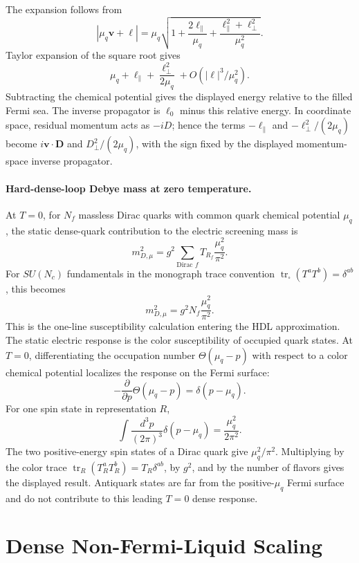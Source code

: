 The expansion follows from
\[
  |\mu_q\mathbf v+\boldsymbol\ell|
  =
  \mu_q
  \sqrt{
    1+\frac{2\ell_\parallel}{\mu_q}
    +\frac{\ell_\parallel^2+\boldsymbol\ell_\perp^2}{\mu_q^2}
  }.
\]
Taylor expansion of the square root gives
\[
  \mu_q+\ell_\parallel+\frac{\boldsymbol\ell_\perp^2}{2\mu_q}
  +O(|\boldsymbol\ell|^3/\mu_q^2).
\]
Subtracting the chemical potential gives the displayed energy relative to
the filled Fermi sea.  The inverse propagator is \(\ell_0\) minus this
relative energy.  In coordinate space, residual momentum acts as
\(-iD\); hence the terms \(-\ell_\parallel\) and
\(-\boldsymbol\ell_\perp^2/(2\mu_q)\) become
\(i\mathbf v\cdot\mathbf D\) and \(D_\perp^2/(2\mu_q)\), with the sign
fixed by the displayed momentum-space inverse propagator.

\paragraph{Hard-dense-loop Debye mass at zero temperature.}
At \(T=0\), for \(N_f\) massless Dirac quarks with common quark chemical
potential \(\mu_q\), the static dense-quark contribution to the electric
screening mass is
\[
  m_{D,\mu}^2
  =
  g^2\sum_{\text{Dirac }f}T_{R_f}\frac{\mu_q^2}{\pi^2}.
\]
For \(SU(N_c)\) fundamentals in the monograph trace convention
\(\operatorname{tr}_{\square}(T^aT^b)=\delta^{ab}\), this becomes
\[
  m_{D,\mu}^2=g^2N_f\frac{\mu_q^2}{\pi^2}.
\]
This is the one-line susceptibility calculation entering the HDL
approximation.  The static electric response is the color susceptibility of
occupied quark states.  At \(T=0\), differentiating the occupation number
\(\Theta(\mu_q-p)\) with respect to a color chemical potential localizes the
response on the Fermi surface:
\[
  -\frac{\partial}{\partial p}\Theta(\mu_q-p)
  =
  \delta(p-\mu_q).
\]
For one spin state in representation \(R\),
\[
  \int\frac{d^3p}{(2\pi)^3}\delta(p-\mu_q)
  =
  \frac{\mu_q^2}{2\pi^2}.
\]
The two positive-energy spin states of a Dirac quark give
\(\mu_q^2/\pi^2\).  Multiplying by the color trace
\(\operatorname{tr}_{R}(T_R^aT_R^b)=T_R\delta^{ab}\), by \(g^2\), and by the
number of flavors gives the displayed result.  Antiquark states are far
from the positive-\(\mu_q\) Fermi surface and do not contribute to this
leading \(T=0\) dense response.

\section{Dense Non-Fermi-Liquid Scaling}
\label{sec:qcd-non-fermi-liquid-self-energy}

